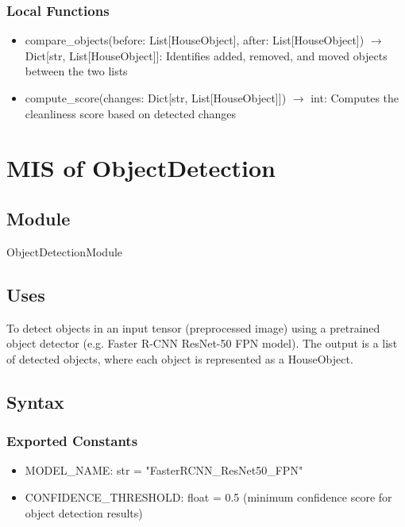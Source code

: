 \documentclass[12pt, titlepage]{article}
\begin{document}
\subsubsection{Local Functions}

\begin{itemize}
  \item compare{\_}objects(before: List[HouseObject], after: List[HouseObject]) $\rightarrow$ Dict[str, List[HouseObject]]: Identifies added, removed, and moved objects between the two lists
  \item compute{\_}score(changes: Dict[str, List[HouseObject]]) $\rightarrow$ int: Computes the cleanliness score based on detected changes
\end{itemize}

\newpage

\section{MIS of ObjectDetection} \label{Module} 

\subsection{Module}

ObjectDetectionModule

\subsection{Uses}
To detect objects in an input tensor (preprocessed image) using a pretrained object detector (e.g. Faster R-CNN ResNet-50 FPN model). The output is a list of detected objects, where each object is represented as a HouseObject.

\subsection{Syntax}

\subsubsection{Exported Constants}

\begin{itemize}
  \item MODEL{\_}NAME: str = "FasterRCNN{\_}ResNet50{\_}FPN"
  \item CONFIDENCE{\_}THRESHOLD: float = 0.5 (minimum confidence score for object detection results)
\end{itemize}
\end{document}
